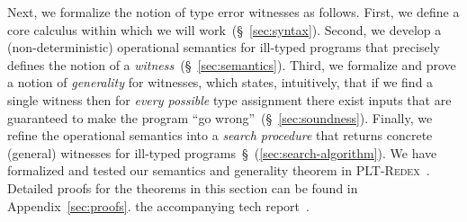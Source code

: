 %
%
%


Next, we formalize the notion of type error witnesses as follows.
%
First, we define a core calculus within which we will work~(\S~\ref{sec:syntax}).
%
Second, we develop a (non-deterministic) operational semantics
for ill-typed programs that precisely defines the notion
of a \emph{witness}~(\S~\ref{sec:semantics}).
%
Third, we formalize and prove a notion of \emph{generality} for
witnesses, which states, intuitively, that if we find a
single witness then for \emph{every possible} type
assignment there exist inputs that are guaranteed to make
the program ``go wrong''~(\S~\ref{sec:soundness}).
%
Finally, we refine the operational semantics into a
\emph{search procedure} that returns concrete (general)
witnesses for ill-typed programs~\S~(\ref{sec:search-algorithm}).
%
We have formalized and tested our semantics and generality theorem
in \textsc{PLT-Redex}~\cite{Felleisen2009-ya}.
%
Detailed proofs for the theorems in this section can be found in
%
{Appendix~\ref{sec:proofs}.}
{the accompanying tech report~\cite{XXX}.}


